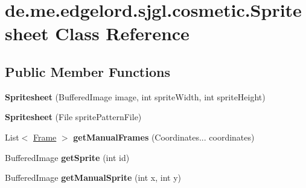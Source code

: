 \hypertarget{classde_1_1me_1_1edgelord_1_1sjgl_1_1cosmetic_1_1_spritesheet}{}\section{de.\+me.\+edgelord.\+sjgl.\+cosmetic.\+Spritesheet Class Reference}
\label{classde_1_1me_1_1edgelord_1_1sjgl_1_1cosmetic_1_1_spritesheet}
\subsection*{Public Member Functions}
\begin{DoxyCompactItemize}
\item 
\mbox{\label{classde_1_1me_1_1edgelord_1_1sjgl_1_1cosmetic_1_1_spritesheet_adfb03d33096aee8120aa5ae262f10e5e}} 
{\bfseries Spritesheet} (Buffered\+Image image, int sprite\+Width, int sprite\+Height)
\item 
\mbox{\label{classde_1_1me_1_1edgelord_1_1sjgl_1_1cosmetic_1_1_spritesheet_af7997d1b21bb304b8992f9cd056bac31}} 
{\bfseries Spritesheet} (File sprite\+Pattern\+File)
\item 
\mbox{\label{classde_1_1me_1_1edgelord_1_1sjgl_1_1cosmetic_1_1_spritesheet_a5569e5efd819c9553bff206f4541235f}} 
List$<$ \mbox{\hyperlink{classde_1_1me_1_1edgelord_1_1sjgl_1_1cosmetic_1_1_frame}{Frame}} $>$ {\bfseries get\+Manual\+Frames} (Coordinates... coordinates)
\item 
\mbox{\label{classde_1_1me_1_1edgelord_1_1sjgl_1_1cosmetic_1_1_spritesheet_a61ccfb5df5f44f5882c6628f71cf1010}} 
Buffered\+Image {\bfseries get\+Sprite} (int id)
\item 
\mbox{\label{classde_1_1me_1_1edgelord_1_1sjgl_1_1cosmetic_1_1_spritesheet_a741a212b482663a0505b5f545e7131d3}} 
Buffered\+Image {\bfseries get\+Manual\+Sprite} (int x, int y)
\item 
\mbox{\label{classde_1_1me_1_1edgelord_1_1sjgl_1_1cosmetic_1_1_spritesheet_a4ce6ea535e1289b84dd12a4878c654e0}} 

\end{DoxyCompactItemize}
